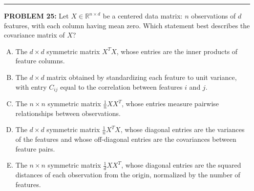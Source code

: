 \documentclass[12pt]{amsart}
\newcommand{\divider}{
  \vspace{-1em} %
  \noindent
  \raisebox{-0.15ex}{\textbullet}%
  \hspace{0.5em}%
  \rule[0.5ex]{0.95\textwidth}{1.0pt}%
  \hspace{0.5em}%
  \raisebox{-0.15ex}{\textbullet}%
  \vspace{0em} %
}
\begin{document}
\divider

{\bf PROBLEM 25:}
Let $X \in \mathbb{R}^{n \times d}$ be a centered data matrix: $n$ observations of $d$ features, with each column having mean zero. Which statement best describes the covariance matrix of $X$?

\begin{enumerate}[(A)]
\item The $d \times d$ symmetric matrix $X^T X$, whose entries are the inner products of feature columns.
\item The $d \times d$ matrix obtained by standardizing each feature to unit variance, with entry $C_{ij}$ equal to the correlation between features $i$ and $j$.
\item The $n \times n$ symmetric matrix $\frac{1}{n} X X^T$, whose entries measure pairwise relationships between observations.
\item The $d \times d$ symmetric matrix $\frac{1}{n} X^T X$, whose diagonal entries are the variances of the features and whose off-diagonal entries are the covariances between feature pairs.
\item The $n \times n$ symmetric matrix $\frac{1}{d} X X^T$, whose diagonal entries are the squared distances of each observation from the origin, normalized by the number of features.
\end{enumerate}
\end{document}
